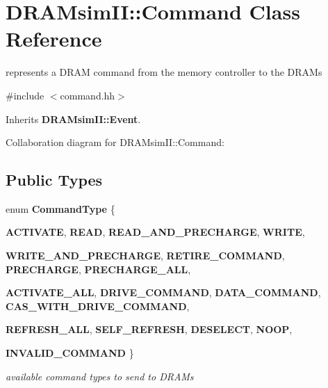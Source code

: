\section{DRAMsimII::Command Class Reference}
\label{class_d_r_a_msim_i_i_1_1_command}


represents a DRAM command from the memory controller to the DRAMs  




{\ttfamily \#include $<$command.hh$>$}



Inherits {\bf DRAMsimII::Event}.



Collaboration diagram for DRAMsimII::Command:\subsection*{Public Types}
\begin{DoxyCompactItemize}
\item 
enum {\bf CommandType} \{ \par
{\bf ACTIVATE}, 
{\bf READ}, 
{\bf READ\_\-AND\_\-PRECHARGE}, 
{\bf WRITE}, 
\par
{\bf WRITE\_\-AND\_\-PRECHARGE}, 
{\bf RETIRE\_\-COMMAND}, 
{\bf PRECHARGE}, 
{\bf PRECHARGE\_\-ALL}, 
\par
{\bf ACTIVATE\_\-ALL}, 
{\bf DRIVE\_\-COMMAND}, 
{\bf DATA\_\-COMMAND}, 
{\bf CAS\_\-WITH\_\-DRIVE\_\-COMMAND}, 
\par
{\bf REFRESH\_\-ALL}, 
{\bf SELF\_\-REFRESH}, 
{\bf DESELECT}, 
{\bf NOOP}, 
\par
{\bf INVALID\_\-COMMAND}
 \}
\begin{DoxyCompactList}\small\item\em available command types to send to DRAMs \item\end{DoxyCompactList}\end{DoxyCompactItemize}
